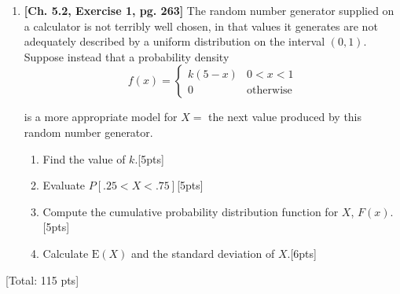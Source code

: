 \documentclass[11pt]{article}\usepackage[]{graphicx}\usepackage[]{color}
\begin{document}
\begin{enumerate}
\begin{enumerate}
                   \item  Find $P(2 \le W \le 10)$ [5 pts]
                   
                   \item  Find $E(W)$ [5 pts]

      \end{enumerate}

  \item \textbf{[Ch. 5.2, Exercise 1, pg. 263]} The random number generator supplied on a calculator is not terribly well chosen, in that values it generates are not adequately described by a uniform distribution on the interval $(0,1)$. Suppose instead that a probability density
    $$
    f(x) = \begin{cases} k(5 - x) & 0 < x< 1 \\ 0 & \text{otherwise}\end{cases}
    $$
    
    is a more appropriate model for $X =$ the next value produced by this random number generator.
    \begin{enumerate}
      \item Find the value of $k$.[5pts]
      \item Evaluate $P[.25 < X < .75]$[5pts]
      \item Compute the cumulative probability distribution function for $X$, $F(x)$. [5pts]
      \item Calculate $\text{E}(X)$ and the standard deviation of $X$.[6pts]
    \end{enumerate}
\end{enumerate}
[Total: 115 pts]
\end{document}
